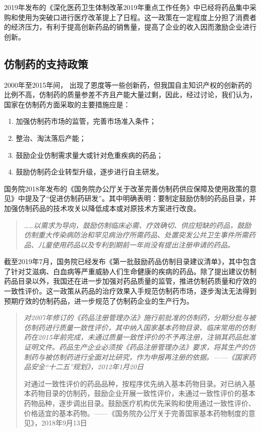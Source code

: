 \documentclass[twocolumn,openany]{ctexbook}
\begin{document}
			2019年发布的《深化医药卫生体制改革2019年重点工作任务》中已经将药品集中采购和使用为突破口进行医疗改革提上了日程。这一政策在一定程度上分担了消费者的经济压力，有利于提高创新药品的销售量，提高了企业的收入因而激励企业进行创新。
			
			\subsection{仿制药的支持政策}
			
			2000年至2015年间， 出现了恩度等一些创新药，但我国自主知识产权的创新药的比例不高，仿制药的质量参差不齐且产能大量过剩，因此，经过讨论，我们认为，国家在仿制药方面采取的主要措施应是：
			
			\begin{enumerate}
				\item 加强仿制药市场的监管，完善市场准入条件；
				\item 整治、淘汰落后产能；
				\item 鼓励企业仿制需求量大或针对危重疾病的药品；
				\item 鼓励仿制药企业转型升级，逐步进行自主研发。
			\end{enumerate}
			
			国务院2018年发布的《国务院办公厅关于改革完善仿制药供应保障及使用政策的意见》中提及了“促进仿制药研发”。其中明确表明：要制定鼓励仿制的药品目录，并加强仿制药品的技术攻关以降低成本或对原技术方案进行改良。
			
			\begin{quotation}
				\itshape
				……以需求为导向，鼓励仿制临床必需、疗效确切、供应短缺的药品，鼓励仿制重大传染病防治和罕见病治疗所需药品、处置突发公共卫生事件所需药品、儿童使用药品以及专利到期前一年尚没有提出注册申请的药品。
			\end{quotation}
			
			截至2019年7月，国务院已经发布《第一批鼓励药品仿制目录建议清单》，其中包含了针对艾滋病、白血病等严重威胁人们生命健康的疾病的药品。除了提出建议仿制药品目录以外，我国还在进一步加强对药品质量的监管，推进仿制药质量和疗效的一致性评价。这一政策从药品的治疗效果入手规范仿制药市场，逐步淘汰无法得到预期疗效的仿制药品，进一步规范了仿制药企业的生产行为。
			
			\begin{quotation}
				\itshape
				对2007年修订的《药品注册管理办法》施行前批准的仿制药，分期分批与被仿制药进行质量一致性评价，其中纳入国家基本药物目录、临床常用的仿制药在2015年前完成，未通过质量一致性评价的不予再注册，注销其药品批准证明文件。药品生产企业必须按《药品注册管理办法》要求，将其生产的仿制药与被仿制药进行全面对比研究，作为申报再注册的依据。——《国家药品安全“十二五”规划》，2012年1月20日
				
				对通过一致性评价的药品品种，按程序优先纳入基本药物目录。对已纳入基本药物目录的仿制药，鼓励企业开展一致性评价，未通过一致性评价的基本药物品种，逐步调出目录。鼓励医疗机构优先采购和使用通过一致性评价、价格适宜的基本药物。——《国务院办公厅关于完善国家基本药物制度的意见》，2018年9月13日
			\end{quotation}
\end{document}
